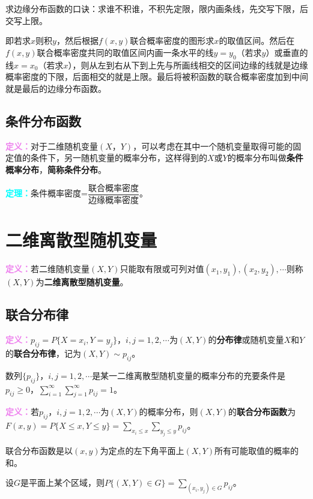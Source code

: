 \documentclass[UTF8, 12pt]{ctexart}
\begin{document}
求边缘分布函数的口诀：求谁不积谁，不积先定限，限内画条线，先交写下限，后交写上限。

即若求$x$则积$y$，然后根据$f(x,y)$联合概率密度的图形求$x$的取值区间。然后在$f(x,y)$联合概率密度共同的取值区间内画一条水平的线$y=y_0$（若求$y$）或垂直的线$x=x_0$（若求$x$），则从左到右从下到上先与所画线相交的区间边缘的线就是边缘概率密度的下限，后面相交的就是上限。最后将被积函数的联合概率密度加到中间就是最后的边缘分布函数。

\subsection{条件分布函数}

\textcolor{violet}{\textbf{定义：}}对于二维随机变量$(X，Y)$，可以考虑在其中一个随机变量取得可能的固定值的条件下，另一随机变量的概率分布，这样得到的$X$或$Y$的概率分布叫做\textbf{条件概率分布}，\textbf{简称条件分布}。

\textcolor{aqua}{\textbf{定理：}}条件概率密度=$\dfrac{\text{联合概率密度}}{\text{边缘概率密度}}$。

\section{二维离散型随机变量}

\textcolor{violet}{\textbf{定义：}}若二维随机变量$(X,Y)$只能取有限或可列对值$(x_1,y_1),(x_2,y_2),\cdots$则称$(X,Y)$为\textbf{二维离散型随机变量}。

\subsection{联合分布律}

\textcolor{violet}{\textbf{定义：}}$p_{ij}=P\{X=x_i,Y=y_j\}$，$i,j=1,2,\cdots$为$(X,Y)$的\textbf{分布律}或随机变量$X$和$Y$的\textbf{联合分布律}，记为$(X,Y)\sim p_{ij}$。

数列$\{p_{ij}\}$，$i,j=1,2,\cdots$是某一二维离散型随机变量的概率分布的充要条件是$p_{ij}\geqslant0$，$\sum\limits_{i=1}^\infty\sum\limits_{j=1}^\infty p_{ij}=1$。

\textcolor{violet}{\textbf{定义：}}若$p_{ij}$，$i,j=1,2,\cdots$为$(X,Y)$的概率分布，则$(X,Y)$的\textbf{联合分布函数}为$F(x,y)=P\{X\leqslant x,Y\leqslant y\}=\sum\limits_{x_i\leqslant x}\sum\limits_{y_j\leqslant y}p_{ij}$。

联合分布函数是以$(x,y)$为定点的左下角平面上$(X,Y)$所有可能取值的概率的和。

设$G$是平面上某个区域，则$P\{(X,Y)\in G\}=\sum\limits_{(x_i,y_j)\in G}p_{ij}$。
\end{document}
